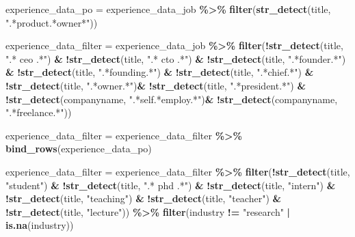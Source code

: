 \documentclass[11pt,]{article}
\newenvironment{Shaded}{\begin{snugshade}}{\end{snugshade}}
\newcommand{\FunctionTok}[1]{\textcolor[rgb]{0.13,0.29,0.53}{\textbf{#1}}}
\newcommand{\NormalTok}[1]{#1}
\newcommand{\OtherTok}[1]{\textcolor[rgb]{0.56,0.35,0.01}{#1}}
\newcommand{\SpecialCharTok}[1]{\textcolor[rgb]{0.81,0.36,0.00}{\textbf{#1}}}
\newcommand{\StringTok}[1]{\textcolor[rgb]{0.31,0.60,0.02}{#1}}
\begin{document}
\begin{Shaded}
\begin{Highlighting}[]
\NormalTok{experience\_data\_po }\OtherTok{=}\NormalTok{ experience\_data\_job }\SpecialCharTok{\%\textgreater{}\%} 
  \FunctionTok{filter}\NormalTok{(}\FunctionTok{str\_detect}\NormalTok{(title, }\StringTok{".*product.*owner*"}\NormalTok{))}

\NormalTok{experience\_data\_filter }\OtherTok{=}\NormalTok{ experience\_data\_job }\SpecialCharTok{\%\textgreater{}\%} 
  \FunctionTok{filter}\NormalTok{(}\SpecialCharTok{!}\FunctionTok{str\_detect}\NormalTok{(title, }\StringTok{".* ceo .*"}\NormalTok{) }\SpecialCharTok{\&}
           \SpecialCharTok{!}\FunctionTok{str\_detect}\NormalTok{(title, }\StringTok{".* cto .*"}\NormalTok{) }\SpecialCharTok{\&}
           \SpecialCharTok{!}\FunctionTok{str\_detect}\NormalTok{(title, }\StringTok{".*founder.*"}\NormalTok{) }\SpecialCharTok{\&}
           \SpecialCharTok{!}\FunctionTok{str\_detect}\NormalTok{(title, }\StringTok{".*founding.*"}\NormalTok{) }\SpecialCharTok{\&}
           \SpecialCharTok{!}\FunctionTok{str\_detect}\NormalTok{(title, }\StringTok{".*chief.*"}\NormalTok{) }\SpecialCharTok{\&}
           \SpecialCharTok{!}\FunctionTok{str\_detect}\NormalTok{(title, }\StringTok{".*owner.*"}\NormalTok{)}\SpecialCharTok{\&}
           \SpecialCharTok{!}\FunctionTok{str\_detect}\NormalTok{(title, }\StringTok{".*president.*"}\NormalTok{) }\SpecialCharTok{\&}
           \SpecialCharTok{!}\FunctionTok{str\_detect}\NormalTok{(companyname, }\StringTok{".*self.*employ.*"}\NormalTok{)}\SpecialCharTok{\&}
           \SpecialCharTok{!}\FunctionTok{str\_detect}\NormalTok{(companyname, }\StringTok{".*freelance.*"}\NormalTok{)) }


\NormalTok{experience\_data\_filter }\OtherTok{=}\NormalTok{ experience\_data\_filter }\SpecialCharTok{\%\textgreater{}\%}
  \FunctionTok{bind\_rows}\NormalTok{(experience\_data\_po)}


\NormalTok{experience\_data\_filter }\OtherTok{=}\NormalTok{ experience\_data\_filter }\SpecialCharTok{\%\textgreater{}\%} 
  \FunctionTok{filter}\NormalTok{(}\SpecialCharTok{!}\FunctionTok{str\_detect}\NormalTok{(title, }\StringTok{"student"}\NormalTok{) }\SpecialCharTok{\&}
           \SpecialCharTok{!}\FunctionTok{str\_detect}\NormalTok{(title, }\StringTok{".* phd .*"}\NormalTok{) }\SpecialCharTok{\&}
           \SpecialCharTok{!}\FunctionTok{str\_detect}\NormalTok{(title, }\StringTok{"intern"}\NormalTok{) }\SpecialCharTok{\&}
           \SpecialCharTok{!}\FunctionTok{str\_detect}\NormalTok{(title, }\StringTok{"teaching"}\NormalTok{) }\SpecialCharTok{\&}
           \SpecialCharTok{!}\FunctionTok{str\_detect}\NormalTok{(title, }\StringTok{"teacher"}\NormalTok{) }\SpecialCharTok{\&}
           \SpecialCharTok{!}\FunctionTok{str\_detect}\NormalTok{(title, }\StringTok{"lecture"}\NormalTok{)) }\SpecialCharTok{\%\textgreater{}\%} 
  \FunctionTok{filter}\NormalTok{(industry }\SpecialCharTok{!=} \StringTok{"research"} \SpecialCharTok{|} \FunctionTok{is.na}\NormalTok{(industry))}




\end{Highlighting}
\end{Shaded}
\end{document}
